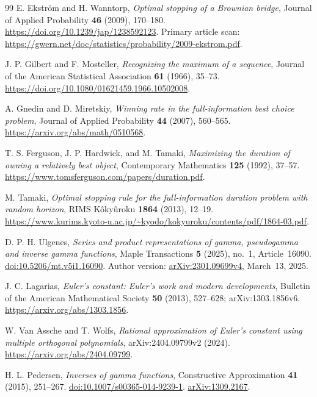 \documentclass[11pt,a4paper]{article}
\theoremstyle{definition}
\theoremstyle{remark}
\numberwithin{equation}{section}
\begin{document}
\begin{thebibliography}{99}
E. Ekstr\"om and H. Wanntorp,
\emph{Optimal stopping of a Brownian bridge},
Journal of Applied Probability \textbf{46} (2009), 170--180.
\url{https://doi.org/10.1239/jap/1238592123}.
Primary article scan:
\url{https://gwern.net/doc/statistics/probability/2009-ekstrom.pdf}.

J. P. Gilbert and F. Mosteller,
\emph{Recognizing the maximum of a sequence},
Journal of the American Statistical Association \textbf{61} (1966), 35--73.
\url{https://doi.org/10.1080/01621459.1966.10502008}.

A. Gnedin and D. Miretskiy,
\emph{Winning rate in the full-information best choice problem},
Journal of Applied Probability \textbf{44} (2007), 560--565.
\url{https://arxiv.org/abs/math/0510568}.

T. S. Ferguson, J. P. Hardwick, and M. Tamaki,
\emph{Maximizing the duration of owning a relatively best object},
Contemporary Mathematics \textbf{125} (1992), 37--57.
\url{https://www.tomsferguson.com/papers/duration.pdf}.

M. Tamaki,
\emph{Optimal stopping rule for the full-information duration problem
with random horizon}, RIMS K\^oky\^uroku \textbf{1864} (2013), 12--19.
\url{https://www.kurims.kyoto-u.ac.jp/~kyodo/kokyuroku/contents/pdf/1864-03.pdf}.

D. P. H. Ulgenes,
\emph{Series and product representations of gamma, pseudogamma and inverse gamma functions},
Maple Transactions \textbf{5} (2025), no.~1, Article~16090.
\href{https://doi.org/10.5206/mt.v5i1.16090}{doi:10.5206/mt.v5i1.16090}.
Author version: \href{https://arxiv.org/abs/2301.09699}{arXiv:2301.09699v4}, March~13, 2025.

J. C. Lagarias,
\emph{Euler's constant: Euler's work and modern developments},
Bulletin of the American Mathematical Society \textbf{50} (2013),
527--628; arXiv:1303.1856v6.
\url{https://arxiv.org/abs/1303.1856}.

W. Van Assche and T. Wolfs,
\emph{Rational approximation of Euler's constant using multiple
orthogonal polynomials}, arXiv:2404.09799v2 (2024).
\url{https://arxiv.org/abs/2404.09799}.

H. L. Pedersen,
\emph{Inverses of gamma functions},
Constructive Approximation \textbf{41} (2015), 251--267.
\href{https://doi.org/10.1007/s00365-014-9239-1}{doi:10.1007/s00365-014-9239-1}.
\href{https://arxiv.org/abs/1309.2167}{arXiv:1309.2167}.


\end{thebibliography}
\end{document}
